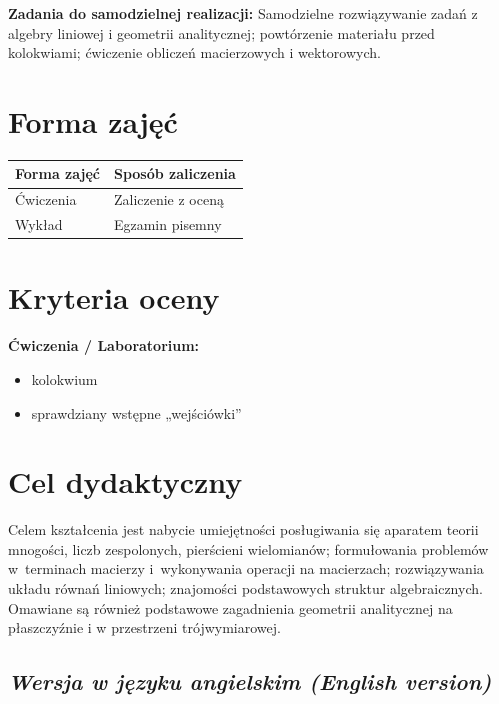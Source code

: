 \documentclass[12pt, a4paper]{article}
\newcommand{\thdrule}{\noalign{\global\setlength{\extrarowheight}{0pt}}}
\newcommand{\thdend}{\noalign{\global\setlength{\extrarowheight}{3pt}}}
\begin{document}
\vspace{4pt}
\noindent\textbf{Zadania do samodzielnej realizacji:} Samodzielne rozwiązywanie zadań z algebry liniowej i geometrii analitycznej; powtórzenie materiału przed kolokwiami; ćwiczenie obliczeń macierzowych i wektorowych.

\section{Forma zajęć}

\begin{center}
{\scriptsize
\begin{tabular}{m{5cm}m{8cm}}
\thdrule\toprule
\rowcolor{pjatkRed} {\color{white}\textbf{Forma zajęć}} & {\color{white}\textbf{Sposób zaliczenia}} \\
\midrule\thdend
  \rowcolor{tableRowLight} Ćwiczenia & Zaliczenie z oceną \\
  \rowcolor{tableRowAlt} Wykład & Egzamin pisemny \\
\bottomrule
\end{tabular}}
\end{center}

\section{Kryteria oceny}

\textbf{Ćwiczenia / Laboratorium:}
\begin{itemize}
  \item kolokwium
  \item sprawdziany wstępne „wejściówki''
\end{itemize}


\section{Cel dydaktyczny}

Celem kształcenia jest nabycie umiejętności posługiwania się aparatem teorii mnogości, liczb zespolonych, pierścieni wielomianów; formułowania problemów w terminach macierzy i wykonywania operacji na macierzach; rozwiązywania układu równań liniowych; znajomości podstawowych struktur algebraicznych. Omawiane są również podstawowe zagadnienia geometrii analitycznej na płaszczyźnie i w przestrzeni trójwymiarowej.

\subsection*{\textit{Wersja w języku angielskim (English version)}}
\end{document}
